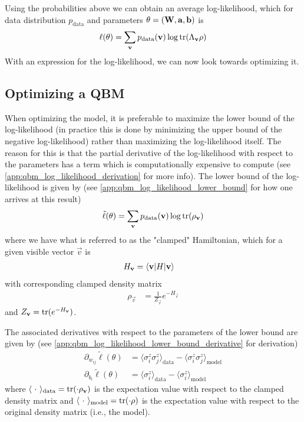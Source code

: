 Using the probabilities above we can obtain an average log-likelihood, which for data distribution \( p_\text{data} \) and parameters \( \theta = (\mathbf{W}, \mathbf{a}, \mathbf{b}) \) is
\begin{align}
    \ell(\theta) = \sum_{\mathbf{v}} p_{\text{data}}(\mathbf{v}) \log \text{tr}(\Lambda_{\mathbf{v}}\rho)
\end{align}
With an expression for the log-likelihood, we can now look towards optimizing it.

\subsection{Optimizing a QBM}
When optimizing the model, it is preferable to maximize the lower bound of the log-likelihood (in practice this is done by minimizing the upper bound of the negative log-likelihood) rather than maximizing the log-likelihood itself.
The reason for this is that the partial derivative of the log-likelihood with respect to the parameters has a term which is computationally expensive to compute (see \cref{app:qbm_log_likelihood_derivation} for more info).
The lower bound of the log-likelihood is given by (see \cref{app:qbm_log_likelihood_lower_bound} for how one arrives at this result)
\begin{align}
    \tilde{\ell}(\theta) = \sum_{\mathbf{v}} p_{\text{data}}(\mathbf{v}) \log \text{tr}(\rho_{\mathbf{v}})
\end{align}
where we have what is referred to as the "clamped" Hamiltonian, which for a given visible vector \( \vec{v} \) is
\begin{align}
    H_{\mathbf{v}}
        &= \braket{\mathbf{v}|H|\mathbf{v}}
\end{align}
with corresponding clamped density matrix
\begin{align}
    \rho_\vec{v}
        &= \frac{1}{Z_\vec{v}} e^{-H_\vec{v}}
\end{align}
and \( Z_{\mathbf{v}} = \text{tr}(e^{-H_{\mathbf{v}}}) \).

The associated derivatives with respect to the parameters of the lower bound are given by (see \cref{app:qbm_log_likelihood_lower_bound_derivative} for derivation)
\begin{align}
    \partial_{w_{ij}} \tilde{\ell}(\theta)
        &= \langle \sigma_i^z \sigma_j^z \rangle_\text{data} - \langle \sigma_i^z \sigma_j^z \rangle_\text{model} \\
    \partial_{b_i} \tilde{\ell}(\theta)
        &= \langle \sigma_i^z \rangle_\text{data} - \langle \sigma_i^z \rangle_\text{model}
\end{align}
where \( \langle \ \cdot \ \rangle_\text{data} = \text{tr}(\cdot \rho_{\mathbf{v}}) \) is the expectation value with respect to the clamped density matrix and \( \langle \ \cdot \ \rangle_\text{model} = \tr(\cdot \rho) \) is the expectation value with respect to the original density matrix (i.e., the model).

